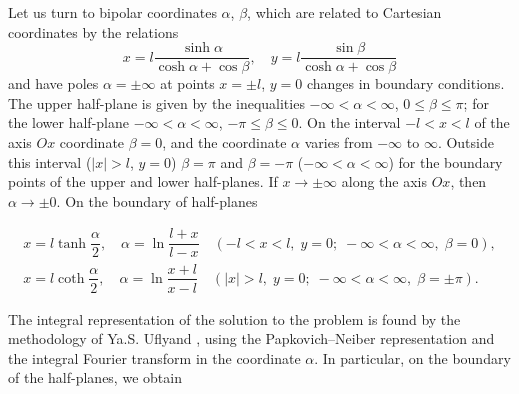 Let us turn to bipolar coordinates $\alpha $, $\beta $, which are related to Cartesian coordinates by the relations
\begin{equation} \label{Ostryk_Eq_4_} 
x=l\dfrac{\sinh \alpha }{\cosh \alpha +\cos \beta } , \quad   y=l\dfrac{\sin \beta }{\cosh \alpha +\cos \beta }  
\end{equation} 
and have poles $\alpha =\pm \infty $ at points $x=\pm l$, $y=0$ changes in boundary conditions. The upper half-plane is given by the inequalities $-\infty <\alpha <\infty $, $0\le \beta \le \pi $; for the lower half-plane $-\infty <\alpha <\infty $, $-\pi \le \beta \le 0$. On the interval $-l<x<l$ of the axis $Ox$ coordinate $\beta =0$, and the coordinate $\alpha $ varies from $-\infty $ to $\infty $. Outside this interval ($\left|x\right|>l$, $y=0$) $\beta =\pi $ and $\beta =-\pi $ ($-\infty <\alpha <\infty $) for the boundary points of the upper and lower half-planes. If $x\to \pm \infty $ along the axis $Ox$, then $\alpha \to \pm 0$. On the boundary of half-planes

\begin{equation} \label{Ostryk_Eq_5_} 
\begin{array}{l}
	x=l\tanh \dfrac{\alpha }{2} , \quad  \alpha =\ln \dfrac{l+x}{l-x} \quad   (-l<x<l,\; y=0;\;  -\infty <\alpha <\infty ,\; \beta =0),
	\\
	x=l\coth \dfrac{\alpha }{2} ,\quad   \alpha =\ln \dfrac{x+l}{x-l}   \quad (\left|x\right|>l,\; y=0;\;  -\infty <\alpha <\infty ,\; \beta =\pm \pi ).  
\end{array}
\end{equation} 

The integral representation of the solution to the problem is found by the methodology of Ya.S. Uflyand \cite{Ostryk71}, using the Papkovich--Neiber representation and the integral Fourier transform in the coordinate $\alpha $. In particular, on the boundary of the half-planes, we obtain

